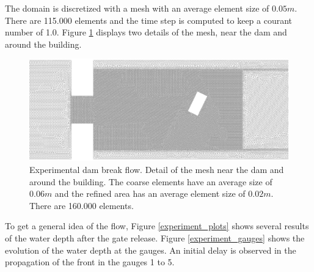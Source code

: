 The domain is discretized with a mesh with an average element size of $0.05m$. There are 115.000 elements and the time step is computed to keep a courant number of 1.0. Figure \ref{experiment_mesh} displays two details of the mesh, near the dam and around the building.

\begin{figure}[H]
\centering
\includegraphics[width=.8\textwidth]{img/eulerian/exp/experiment_mesh.png}
\caption{Experimental dam break flow. Detail of the mesh near the dam and around the building. The coarse elements have an average size of $0.06m$ and the refined area has an average element size of $0.02m$. There are 160.000 elements.}
\label{experiment_mesh}
\end{figure}

To get a general idea of the flow, Figure \ref{experiment_plots} shows several results of the water depth after the gate release. Figure \ref{experiment_gauges} shows the evolution of the water depth at the gauges. An initial delay is observed in the propagation of the front in the gauges 1 to 5.

